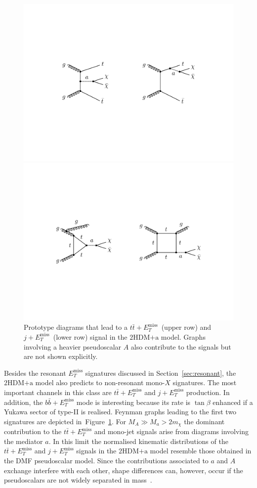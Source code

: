 \documentclass[review]{elsarticle}
\newcommand{\MET}{\ensuremath{E_T^\mathrm{miss}}\xspace}
\newcommand{\hdma}{\ensuremath{\textrm{2HDM+a}}\xspace}
\begin{document}
\begin{figure}[t!]
\centering
\includegraphics[width=.725\textwidth]{ttmet.pdf}

\vspace{7mm}

\includegraphics[width=.8\textwidth]{jmet.pdf}

\vspace{4mm}
\caption{\label{fig:nonresonant} Prototype diagrams that lead  to a $t \bar t+\MET$~(upper row) and $j+\MET$~(lower row) signal in the \hdma model. Graphs involving a heavier pseudoscalar $A$ also contribute to the signals but are not shown explicitly.}
\end{figure}

Besides the resonant $\MET$ signatures discussed in Section~\ref{sec:resonant}, the   \hdma model also predicts to non-resonant mono-$X$ signatures. The most important channels in this class are $t \bar t +\MET$ and $j+\MET$ production. In addition, the $b \bar b +\MET$ mode is interesting because its rate is $\tan \beta$ enhanced if a Yukawa sector of  type-II is realised.  Feynman graphs leading to the first two signatures are depicted in~Figure~\ref{fig:nonresonant}. For $M_A \gg M_a > 2 m_\chi$ the dominant contribution to the  $t \bar t +\MET$ and mono-jet signals arise from diagrams involving the  mediator $a$. In this limit the normalised kinematic distributions of the $t \bar t + \MET$ and $j+\MET$ signals in the \hdma model resemble those obtained in the DMF pseudoscalar   model. Since the contributions  associated to $a$ and $A$ exchange interfere with each other, shape differences can, however, occur if the pseudoscalars are not widely separated in mass~\cite{Bauer:2017ota}.
\end{document}
